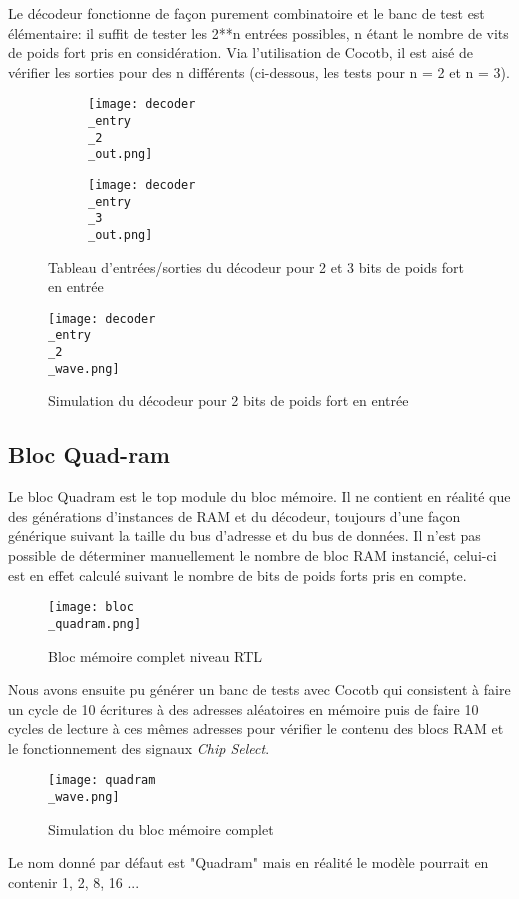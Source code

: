 \indent Le décodeur fonctionne de façon purement combinatoire et le banc de test est élémentaire: il suffit de tester les 2**n entrées possibles, n étant le nombre de vits de poids fort pris en considération. Via l'utilisation de Cocotb, il est aisé de vérifier les sorties pour des n différents (ci-dessous, les tests pour n = 2 et n = 3).

\begin{figure}[h]
	\centering
	\begin{subfigure}{0.3\textwidth}
		\texttt{[image: decoder\\\_entry\\\_2\\\_out.png]} 
	\end{subfigure}
	\hfill
	\begin{subfigure}{0.3\textwidth}
		\texttt{[image: decoder\\\_entry\\\_3\\\_out.png]}
	\end{subfigure}
	\caption{Tableau d'entrées/sorties du décodeur pour 2 et 3 bits de poids fort en entrée}
	\label{fig:stdout_decoder_2_3}
\end{figure}


\begin{figure}[h]
	\centering
	\texttt{[image: decoder\\\_entry\\\_2\\\_wave.png]}
	\caption{Simulation du décodeur pour 2 bits de poids fort en entrée}
	\label{fig:wave_bloc_decoder}
\end{figure}

\newpage

\subsection{Bloc Quad-ram}

\indent Le bloc Quadram est le top module du bloc mémoire. Il ne contient en réalité que des générations d'instances de RAM et du décodeur, toujours d'une façon générique suivant la taille du bus d'adresse et du bus de données. Il n'est pas possible de déterminer manuellement le nombre de bloc RAM instancié, celui-ci est en effet calculé suivant le nombre de bits de poids forts pris en compte.

\begin{figure}[h]
	\centering
	\texttt{[image: bloc\\\_quadram.png]}
	\caption{Bloc mémoire complet niveau RTL}
	\label{fig:synth_bloc_quadram}
\end{figure}

\indent Nous avons ensuite pu générer un banc de tests avec Cocotb qui consistent à faire un cycle de 10 écritures à des adresses aléatoires en mémoire puis de faire 10 cycles de lecture à ces mêmes adresses pour vérifier le contenu des blocs RAM et le fonctionnement des signaux \textit{Chip Select}.

\begin{figure}[h]
	\centering
	\texttt{[image: quadram\\\_wave.png]}
	\caption{Simulation du bloc mémoire complet}
	\label{fig:wave_bloc_quadram}
\end{figure}

\indent Le nom donné par défaut est "Quadram" mais en réalité le modèle pourrait en contenir 1, 2, 8, 16 ...

